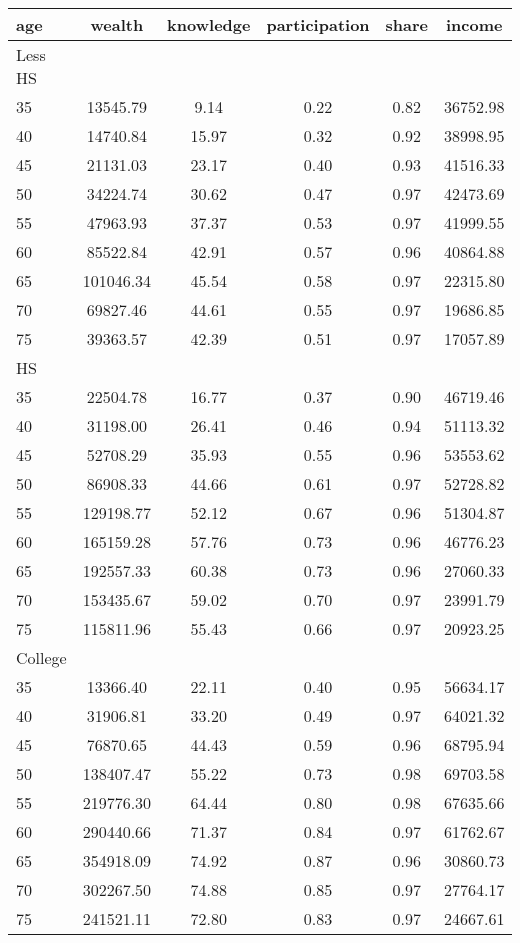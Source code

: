  \begin{tabular}{lccccc}
 \hline \hline
  age & wealth & knowledge & participation & share & income \\
 \hline
 Less HS & & & & & \\
 \hline
35 &  13545.79 &      9.14 &      0.22 &      0.82 &  36752.98 \\ 
40 &  14740.84 &     15.97 &      0.32 &      0.92 &  38998.95 \\ 
45 &  21131.03 &     23.17 &      0.40 &      0.93 &  41516.33 \\ 
50 &  34224.74 &     30.62 &      0.47 &      0.97 &  42473.69 \\ 
55 &  47963.93 &     37.37 &      0.53 &      0.97 &  41999.55 \\ 
60 &  85522.84 &     42.91 &      0.57 &      0.96 &  40864.88 \\ 
65 & 101046.34 &     45.54 &      0.58 &      0.97 &  22315.80 \\ 
70 &  69827.46 &     44.61 &      0.55 &      0.97 &  19686.85 \\ 
75 &  39363.57 &     42.39 &      0.51 &      0.97 &  17057.89 \\ 
 \hline
 HS & & & & & \\
 \hline
35 &  22504.78 &     16.77 &      0.37 &      0.90 &  46719.46 \\ 
40 &  31198.00 &     26.41 &      0.46 &      0.94 &  51113.32 \\ 
45 &  52708.29 &     35.93 &      0.55 &      0.96 &  53553.62 \\ 
50 &  86908.33 &     44.66 &      0.61 &      0.97 &  52728.82 \\ 
55 & 129198.77 &     52.12 &      0.67 &      0.96 &  51304.87 \\ 
60 & 165159.28 &     57.76 &      0.73 &      0.96 &  46776.23 \\ 
65 & 192557.33 &     60.38 &      0.73 &      0.96 &  27060.33 \\ 
70 & 153435.67 &     59.02 &      0.70 &      0.97 &  23991.79 \\ 
75 & 115811.96 &     55.43 &      0.66 &      0.97 &  20923.25 \\ 
 \hline
 College & & & & & \\
 \hline
35 &  13366.40 &     22.11 &      0.40 &      0.95 &  56634.17 \\ 
40 &  31906.81 &     33.20 &      0.49 &      0.97 &  64021.32 \\ 
45 &  76870.65 &     44.43 &      0.59 &      0.96 &  68795.94 \\ 
50 & 138407.47 &     55.22 &      0.73 &      0.98 &  69703.58 \\ 
55 & 219776.30 &     64.44 &      0.80 &      0.98 &  67635.66 \\ 
60 & 290440.66 &     71.37 &      0.84 &      0.97 &  61762.67 \\ 
65 & 354918.09 &     74.92 &      0.87 &      0.96 &  30860.73 \\ 
70 & 302267.50 &     74.88 &      0.85 &      0.97 &  27764.17 \\ 
75 & 241521.11 &     72.80 &      0.83 &      0.97 &  24667.61 \\ 
 \hline \hline
 \end{tabular}
